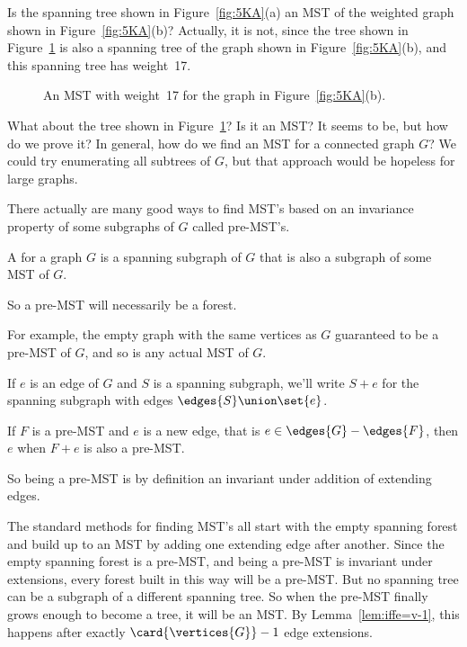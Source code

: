 Is the spanning tree shown in Figure~\ref{fig:5KA}(a) an MST of the
weighted graph shown in Figure~\ref{fig:5KA}(b)?  Actually, it is not,
since the tree shown in Figure~\ref{fig:5KB} is also a spanning tree
of the graph shown in Figure~\ref{fig:5KA}(b), and this spanning tree
has weight~17.

\begin{figure}


\caption{An MST with weight~17 for the graph in
  Figure~\ref{fig:5KA}(b).}
\label{fig:5KB}

\end{figure}

What about the tree shown in Figure~\ref{fig:5KB}?  Is it an MST?  It
seems to be, but how do we prove it?  In general, how do we find an
MST for a connected graph $G$?  We could try enumerating all subtrees
of $G$, but that approach would be hopeless for large graphs.

\begin{editingnotes}
\end{editingnotes}
There actually are many good ways to find MST's based on an invariance
property of some subgraphs of $G$ called pre-MST's.

\begin{definition}
A  for a graph $G$ is a spanning
subgraph of $G$ that is also a subgraph of some MST of $G$.
\end{definition}
So a pre-MST will necessarily be a forest.

For example, the empty graph with the same vertices as $G$ guaranteed
to be a pre-MST of $G$, and so is any actual MST of $G$.

 \iffalse In the rest of this section, subgraphs and forests will
 always be spanning forests and spanning subgraphs of $G$, that is
 they will have the same vertices as $G$.\fi

If $e$ is an edge of $G$ and $S$ is a spanning subgraph, we'll write
$S+e$ for the spanning subgraph with edges $\edges{S} \union \set{e}$.
\begin{definition}
If $F$ is a pre-MST and $e$ is a new edge, that is $e \in
\edges{G}-\edges{F}$, then $e$  when $F+e$ is also a
pre-MST.
\end{definition}
So being a pre-MST is by definition an invariant under addition of
extending edges.

The standard methods for finding MST's all start with the empty
spanning forest and build up to an MST by adding one extending edge
after another.  Since the empty spanning forest is a pre-MST, and
being a pre-MST is invariant under extensions, every forest built in
this way will be a pre-MST.  But no spanning tree can be a subgraph of
a different spanning tree.  So when the pre-MST finally grows enough
to become a tree, it will be an MST.  By Lemma~\ref{lem:iffe=v-1}, this
happens after exactly $\card{\vertices{G}}-1$ edge extensions.

